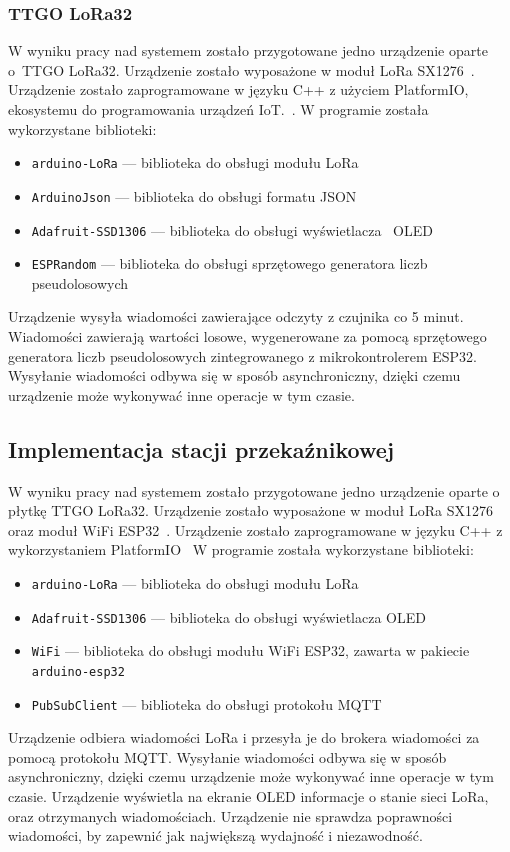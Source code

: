 \subsubsection{TTGO LoRa32}
W wyniku pracy nad systemem zostało przygotowane jedno urządzenie oparte o~TTGO LoRa32. Urządzenie zostało wyposażone w moduł LoRa SX1276~\cite{ESP32:sx1276-doc}. Urządzenie zostało zaprogramowane w języku C++ z użyciem PlatformIO, ekosystemu do programowania urządzeń IoT.~\cite{tool:pio}. W programie została wykorzystane biblioteki:
\begin{itemize}
    \item \texttt{arduino-LoRa} — biblioteka do obsługi modułu LoRa
          ~\cite{ESP32:lora-lib}
    \item \texttt{ArduinoJson} — biblioteka do obsługi formatu JSON~\cite{ESP32:ArduinoJson}
    \item \texttt{Adafruit-SSD1306} — biblioteka do obsługi wyświetlacza~\cite{ESP32:Adafruit-SSD1306} OLED
    \item \texttt{ESPRandom} — biblioteka do obsługi sprzętowego generatora liczb pseudolosowych~\cite{ESP32:ESPRandom}
\end{itemize}
Urządzenie wysyła wiadomości zawierające odczyty z czujnika co 5 minut. Wiadomości zawierają wartości losowe, wygenerowane za pomocą sprzętowego generatora liczb pseudolosowych zintegrowanego z mikrokontrolerem ESP32.  Wysyłanie wiadomości odbywa się w sposób asynchroniczny, dzięki czemu urządzenie może wykonywać inne operacje w tym czasie.

\subsection{Implementacja stacji przekaźnikowej}
W wyniku pracy nad systemem zostało przygotowane jedno urządzenie oparte o płytkę TTGO LoRa32. Urządzenie zostało wyposażone w moduł LoRa SX1276~\cite{ESP32:sx1276-doc} oraz moduł WiFi ESP32~\cite{ESP32:datasheet}. Urządzenie zostało zaprogramowane w języku C++ z wykorzystaniem PlatformIO~\cite{tool:pio} W programie została wykorzystane biblioteki:
\begin{itemize}
    \item \texttt{arduino-LoRa} — biblioteka do obsługi modułu LoRa~\cite{ESP32:lora-lib}
    \item \texttt{Adafruit-SSD1306} — biblioteka do obsługi wyświetlacza OLED~\cite{ESP32:Adafruit-SSD1306}
    \item \texttt{WiFi} — biblioteka do obsługi modułu WiFi ESP32, zawarta w pakiecie \texttt{arduino-esp32}~\cite{ESP32:Arduino}
    \item \texttt{PubSubClient} — biblioteka do obsługi protokołu MQTT~\cite{ESP32:PubSubClient}
\end{itemize}
Urządzenie odbiera wiadomości LoRa i przesyła je do brokera wiadomości za pomocą protokołu MQTT. Wysyłanie wiadomości odbywa się w sposób asynchroniczny, dzięki czemu urządzenie może wykonywać inne operacje w tym czasie. Urządzenie wyświetla na ekranie OLED informacje o stanie sieci LoRa, oraz otrzymanych wiadomościach. Urządzenie nie sprawdza poprawności wiadomości, by zapewnić jak największą wydajność i niezawodność.

